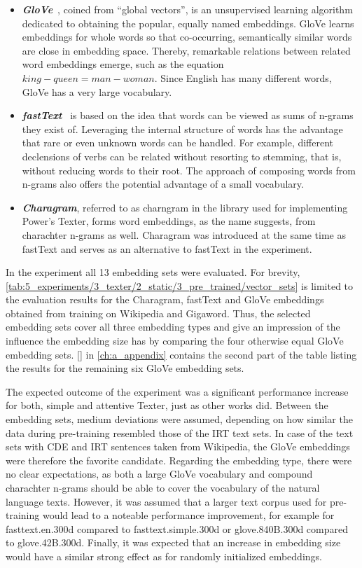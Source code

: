 \begin{itemize}
    \item \textbf{\emph{GloVe}}~\cite{Pennington2014GloveGV}, coined from ``global vectors'', is an unsupervised learning algorithm dedicated to obtaining the popular, equally named embeddings. GloVe learns embeddings for whole words so that co-occurring, semantically similar words are close in embedding space. Thereby, remarkable relations between related word embeddings emerge, such as the equation $king - queen = man - woman$. Since English has many different words, GloVe has a very large vocabulary.

    \item \textbf{\emph{fastText}}~\cite{Bojanowski2017EnrichingWV,Mikolov2018AdvancesIP}  is based on the idea that words can be viewed as sums of n-grams they exist of. Leveraging the internal structure of words has the advantage that rare or even unknown words can be handled. For example, different declensions of verbs can be related without resorting to stemming, that is, without reducing words to their root. The approach of composing words from n-grams also offers the potential advantage of a small vocabulary.

    \item \textbf{\emph{Charagram}}, referred to as charngram in the library used for implementing Power's Texter, forms word embeddings, as the name suggests, from charachter n-grams as well. Charagram was introduced at the same time as fastText and serves as an alternative to fastText in the experiment.
\end{itemize}

In the experiment all 13 embedding sets were evaluated. For brevity, \autoref{tab:5_experiments/3_texter/2_static/3_pre_trained/vector_sets} is limited to the evaluation results for the Charagram, fastText and GloVe embeddings obtained from training on Wikipedia and Gigaword. Thus, the selected embedding sets cover all three embedding types and give an impression of the influence the embedding size has by comparing the four otherwise equal GloVe embedding sets. \autoref{} in \autoref{ch:a_appendix} contains the second part of the table listing the results for the remaining six GloVe embedding sets.

The expected outcome of the experiment was a significant performance increase for both, simple and attentive Texter, just as other works did. Between the embedding sets, medium deviations were assumed, depending on how similar the data during pre-training resembled those of the IRT text sets. In case of the text sets with CDE and IRT sentences taken from Wikipedia, the GloVe embeddings were therefore the favorite candidate. Regarding the embedding type, there were no clear expectations, as both a large GloVe vocabulary and compound charachter n-grams should be able to cover the vocabulary of the natural language texts. However, it was assumed that a larger text corpus used for pre-training would lead to a noteable performance improvement, for example for fasttext.en.300d compared to fasttext.simple.300d or glove.840B.300d compared to glove.42B.300d. Finally, it was expected that an increase in embedding size would have a similar strong effect as for randomly initialized embeddings.

